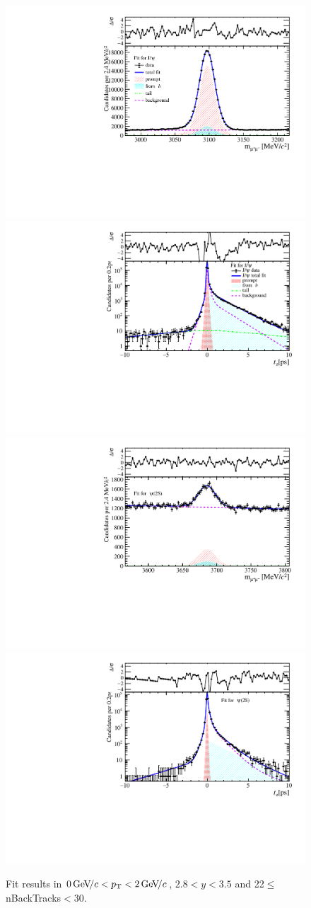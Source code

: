\begin{figure}[H]
\begin{center}
\includegraphics[width=0.47\linewidth]{pdf/Jpsi/drawmassB/n4y2pt1.pdf}
\includegraphics[width=0.47\linewidth]{pdf/Jpsi/2DFitB/n4y2pt1.pdf}
\vspace*{-0.5cm}
\includegraphics[width=0.47\linewidth]{pdf/Psi2S/drawmassB/n4y2pt1.pdf}
\includegraphics[width=0.47\linewidth]{pdf/Psi2S/2DFitB/n4y2pt1.pdf}
\vspace*{-0.5cm}
\end{center}
\caption{Fit results in $0\text{\,Ge\kern -0.1em V\!/}c<p_{\mathrm{T}}<2\text{\,Ge\kern -0.1em V\!/}c$, $2.8<y<3.5$ and 22$\leq$nBackTracks$<$30.}
\label{Fitn4y2pt1}
\end{figure}

